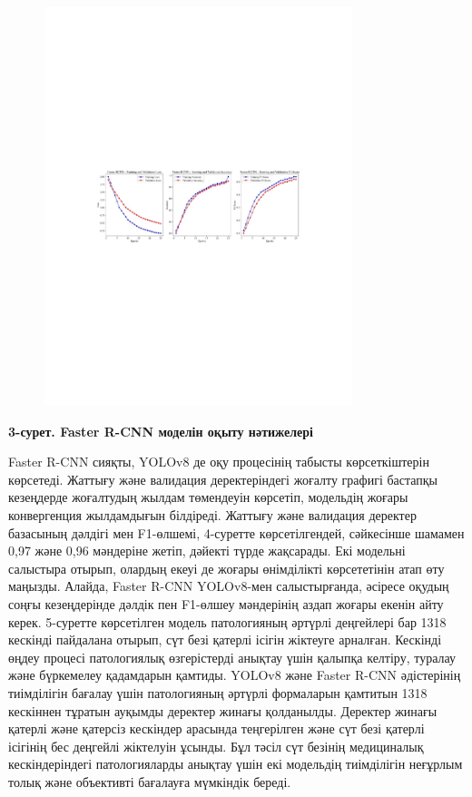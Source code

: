 \begin{figure}[H]
	\centering
	\includegraphics[width=0.8\textwidth]{media/ict/image25}
	\caption*{}
\end{figure}


{\bfseries 3-сурет. Faster R-CNN моделін оқыту нәтижелері}

Faster R-CNN сияқты, YOLOv8 де оқу процесінің табысты көрсеткіштерін
көрсетеді. Жаттығу және валидация деректеріндегі жоғалту графигі
бастапқы кезеңдерде жоғалтудың жылдам төмендеуін көрсетіп, модельдің
жоғары конвергенция жылдамдығын білдіреді. Жаттығу және валидация
деректер базасының дәлдігі мен F1-өлшемі, 4-суретте көрсетілгендей,
сәйкесінше шамамен 0,97 және 0,96 мәндеріне жетіп, дәйекті түрде
жақсарады. Екі модельні салыстыра отырып, олардың екеуі де жоғары
өнімділікті көрсететінін атап өту маңызды. Алайда, Faster R-CNN
YOLOv8-мен салыстырғанда, әсіресе оқудың соңғы кезеңдерінде дәлдік пен
F1-өлшеу мәндерінің аздап жоғары екенін айту керек. 5-суретте
көрсетілген модель патологияның әртүрлі деңгейлері бар 1318 кескінді
пайдалана отырып, сүт безі қатерлі ісігін жіктеуге арналған. Кескінді
өңдеу процесі патологиялық өзгерістерді анықтау үшін қалыпқа келтіру,
туралау және бүркемелеу қадамдарын қамтиды. YOLOv8 және Faster R-CNN
әдістерінің тиімділігін бағалау үшін патологияның әртүрлі формаларын
қамтитын 1318 кескіннен тұратын ауқымды деректер жинағы қолданылды.
Деректер жинағы қатерлі және қатерсіз кескіндер арасында теңгерілген
және сүт безі қатерлі ісігінің бес деңгейлі жіктелуін ұсынды. Бұл тәсіл
сүт безінің медициналық кескіндеріндегі патологияларды анықтау үшін екі
модельдің тиімділігін неғұрлым толық және объективті бағалауға мүмкіндік
береді.

